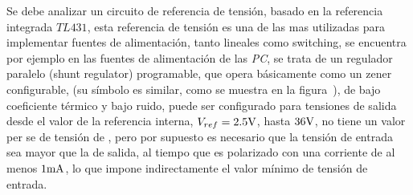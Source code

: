 Se debe analizar un circuito de referencia de tensión, basado en la referencia integrada $TL431$, esta referencia de tensión es una de las mas utilizadas para implementar fuentes de alimentación, tanto lineales como switching, se encuentra por ejemplo en las fuentes de alimentación de las \textit{PC}, se trata de un regulador paralelo (shunt regulator) programable, que opera básicamente como un zener configurable, (su símbolo es similar, como se muestra en la figura~), de bajo coeficiente térmico y bajo ruido, puede ser configurado para tensiones de salida desde el valor de la referencia interna, $V_{ref} = 2.5 \si[per-mode=symbol]{\volt}$, hasta $36 \si[per-mode=symbol]{\volt}$, no tiene un valor per se de tensión de , pero por supuesto es necesario que la tensión de entrada sea mayor que la de salida, al tiempo que es polarizado con una corriente de al menos $1 \si[per-mode=symbol]{\milli\ampere}$, lo que impone indirectamente el valor mínimo de tensión de entrada.
